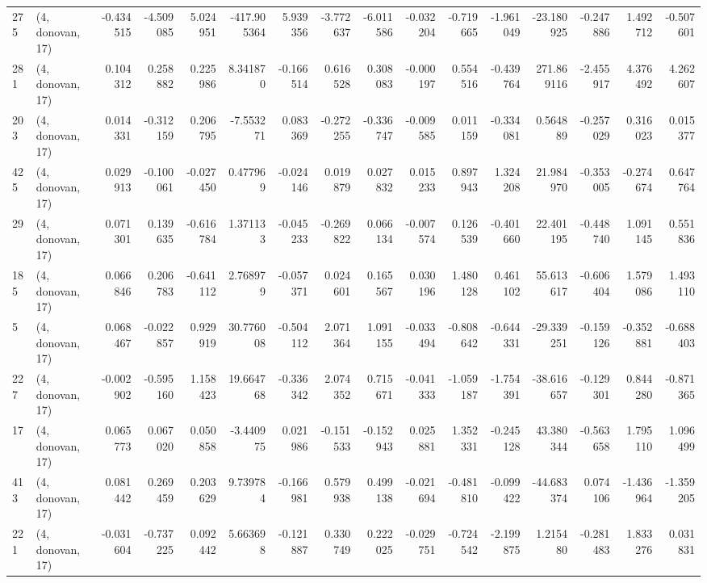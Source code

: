 \begin{tabular}{llrrrrrrrrrrrrrr}
275 &  (4, donovan, 17) &  -0.434515 & -4.509085 &  5.024951 & -417.905364 &  5.939356 &  -3.772637 & -6.011586 & -0.032204 & -0.719665 & -1.961049 &  -23.180925 & -0.247886 &  1.492712 & -0.507601 \\
281 &  (4, donovan, 17) &   0.104312 &  0.258882 &  0.225986 &    8.341870 & -0.166514 &   0.616528 &  0.308083 & -0.000197 &  0.554516 & -0.439764 &  271.869116 & -2.455917 &  4.376492 &  4.262607 \\
203 &  (4, donovan, 17) &   0.014331 & -0.312159 &  0.206795 &   -7.553271 &  0.083369 &  -0.272255 & -0.336747 & -0.009585 &  0.011159 & -0.334081 &    0.564889 & -0.257029 &  0.316023 &  0.015377 \\
425 &  (4, donovan, 17) &   0.029913 & -0.100061 & -0.027450 &    0.477969 & -0.024146 &   0.019879 &  0.027832 &  0.015233 &  0.897943 &  1.324208 &   21.984970 & -0.353005 & -0.274674 &  0.647764 \\
29  &  (4, donovan, 17) &   0.071301 &  0.139635 & -0.616784 &    1.371133 & -0.045233 &  -0.269822 &  0.066134 & -0.007574 &  0.126539 & -0.401660 &   22.401195 & -0.448740 &  1.091145 &  0.551836 \\
185 &  (4, donovan, 17) &   0.066846 &  0.206783 & -0.641112 &    2.768979 & -0.057371 &   0.024601 &  0.165567 &  0.030196 &  1.480128 &  0.461102 &   55.613617 & -0.606404 &  1.579086 &  1.493110 \\
5   &  (4, donovan, 17) &   0.068467 & -0.022857 &  0.929919 &   30.776008 & -0.504112 &   2.071364 &  1.091155 & -0.033494 & -0.808642 & -0.644331 &  -29.339251 & -0.159126 & -0.352881 & -0.688403 \\
227 &  (4, donovan, 17) &  -0.002902 & -0.595160 &  1.158423 &   19.664768 & -0.336342 &   2.074352 &  0.715671 & -0.041333 & -1.059187 & -1.754391 &  -38.616657 & -0.129301 &  0.844280 & -0.871365 \\
17  &  (4, donovan, 17) &   0.065773 &  0.067020 &  0.050858 &   -3.440975 &  0.021986 &  -0.151533 & -0.152943 &  0.025881 &  1.352331 & -0.245128 &   43.380344 & -0.563658 &  1.795110 &  1.096499 \\
413 &  (4, donovan, 17) &   0.081442 &  0.269459 &  0.203629 &    9.739784 & -0.166981 &   0.579938 &  0.499138 & -0.021694 & -0.481810 & -0.099422 &  -44.683374 &  0.074106 & -1.436964 & -1.359205 \\
221 &  (4, donovan, 17) &  -0.031604 & -0.737225 &  0.092442 &    5.663698 & -0.121887 &   0.330749 &  0.222025 & -0.029751 & -0.724542 & -2.199875 &    1.215480 & -0.281483 &  1.833276 &  0.031831 \\

\end{tabular}
